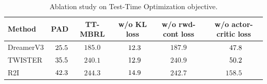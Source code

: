 \begin{table}[ht]
    \caption{Ablation study on Test-Time Optimization objective.}
    \centering
    \setlength{\tabcolsep}{4.5pt}
    \hfill \break
    \begin{tabular}{lccccc}
    \toprule
    \textbf{Method} & \textbf{PAD} & \textbf{TT-MBRL} & \textbf{w/o KL loss} & \textbf{w/o rwd-cont loss} & \textbf{w/o actor-critic loss} \\
    \midrule
    DreamerV3 & $\hphantom{0}25.5$ & $185.0$ & $\hphantom{0}12.3$ & $\mathbf{187.9}$ & $\hphantom{0}47.8$ \\
    TWISTER & $\hphantom{0}35.5$ & $240.1$ & $\hphantom{0}12.9$ & $\mathbf{240.9}$ & $\hphantom{0}50.2$  \\
    R2I & $\hphantom{0}42.3$ & $\mathbf{244.3}$ & $\hphantom{0}14.9$ & $242.7$ & $158.5$ \\
    \bottomrule
    \end{tabular}
    \label{table:study_objective}
\end{table}